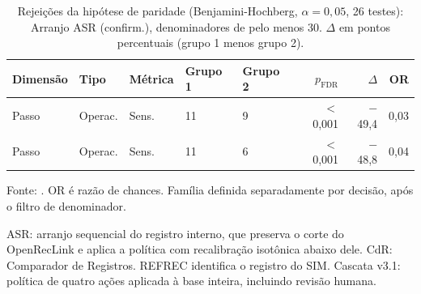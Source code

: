\begin{table}[htbp]
\centering
\caption{Rejei\c{c}\~oes da hip\'otese de paridade (Benjamini-Hochberg, $\alpha = 0{,}05$, 26 testes): Arranjo ASR (confirm.), denominadores de pelo menos 30. $\Delta$ em pontos percentuais (grupo 1 menos grupo 2).}
\label{tab:equidade-den30-arranjo-P-confirmacao}
\small
\begin{tabular}{lllllrrr}
\toprule
Dimens\~ao & Tipo & M\'etrica & Grupo 1 & Grupo 2 & $p_{\mathrm{FDR}}$ & $\Delta$ & OR \\
\midrule
Passo & Operac. & Sens. & 11 & 9 & $<$0{,}001 & $-$49{,}4 & 0{,}03 \\
Passo & Operac. & Sens. & 11 & 6 & $<$0{,}001 & $-$48{,}8 & 0{,}04 \\
\bottomrule
\end{tabular}
\par\footnotesize Fonte: . OR é razão de chances. Família definida separadamente por decisão, após o filtro de denominador.
\par\footnotesize ASR: arranjo sequencial do registro interno, que preserva o corte do OpenRecLink e aplica a política com recalibração isotônica abaixo dele. CdR: Comparador de Registros. REFREC identifica o registro do SIM. Cascata v3.1: política de quatro ações aplicada à base inteira, incluindo revisão humana.
\end{table}
